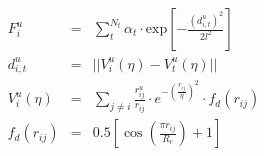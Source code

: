\documentclass[12pt]{article}
\begin{document}
\begin{eqnarray*}
  F_i^u & = &\sum_{t}^{N_t} {\alpha_t \cdot \textrm{exp}{\left[-\frac{\left({d_{i,t}^u}\right)^2}{2l^2}\right]}} \\
  d_{i,t}^u & = & ||V_i^u(\eta) - V_t^u(\eta)|| \\
  V_i^u(\eta) & = & \sum\limits_{j \neq i} \frac{r_{ij}^u}{r_{ij}} \cdot e^{-{\left(\frac{r_{ij}}{\eta}\right)}^2} \cdot f_d{(r_{ij})} \\
  f_d(r_{ij}) & = & 0.5\left[\cos\left(\frac{\pi r_{ij}}{R_c}\right)+1\right]
\end{eqnarray*}                           
\end{document}
